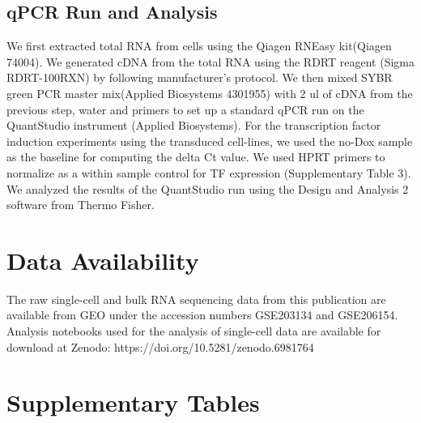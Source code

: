 \subsection{qPCR Run and Analysis}
We first extracted total RNA from cells using the Qiagen RNEasy kit(Qiagen 74004). We generated cDNA from the total RNA using the RDRT reagent (Sigma RDRT-100RXN) by following manufacturer's protocol. We then mixed SYBR green PCR master mix(Applied Biosystems 4301955) with 2 ul of cDNA from the previous step, water and primers to set up a standard qPCR run on the QuantStudio instrument (Applied Biosystems). For the transcription factor induction experiments using the transduced cell-lines, we used the no-Dox sample as the baseline for computing the delta Ct value. We used HPRT primers to normalize as a within sample control for TF expression (Supplementary Table 3). We analyzed the results of the QuantStudio run using the Design and Analysis 2 software from Thermo Fisher.

\section{Data Availability}
The raw single-cell and bulk RNA sequencing data from this publication are available from GEO under the accession numbers GSE203134 and GSE206154. Analysis notebooks used for the analysis of single-cell data are available for download at Zenodo: https://doi.org/10.5281/zenodo.6981764



\clearpage
\section{Supplementary Tables}

